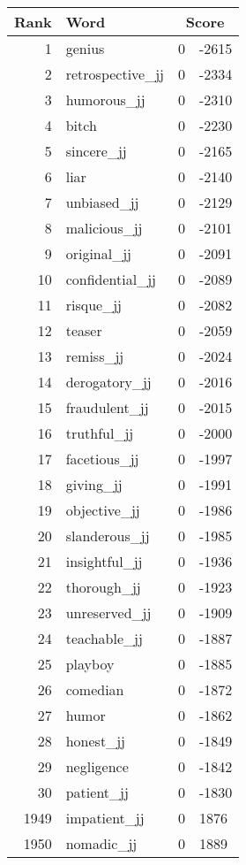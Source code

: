 \begin{longtable}[!htbp]{| rlr@{.}l |}
    \hline
    \textbf{Rank} & \textbf{Word} & \multicolumn{2}{c|}{\textbf{Score}} \\
    \hline
    \endhead
    1 & genius & 0 & -2615 \\
    2 & retrospective\_jj & 0 & -2334 \\
    3 & humorous\_jj & 0 & -2310 \\
    4 & bitch & 0 & -2230 \\
    5 & sincere\_jj & 0 & -2165 \\
    6 & liar & 0 & -2140 \\
    7 & unbiased\_jj & 0 & -2129 \\
    8 & malicious\_jj & 0 & -2101 \\
    9 & original\_jj & 0 & -2091 \\
    10 & confidential\_jj & 0 & -2089 \\
    11 & risque\_jj & 0 & -2082 \\
    12 & teaser & 0 & -2059 \\
    13 & remiss\_jj & 0 & -2024 \\
    14 & derogatory\_jj & 0 & -2016 \\
    15 & fraudulent\_jj & 0 & -2015 \\
    16 & truthful\_jj & 0 & -2000 \\
    17 & facetious\_jj & 0 & -1997 \\
    18 & giving\_jj & 0 & -1991 \\
    19 & objective\_jj & 0 & -1986 \\
    20 & slanderous\_jj & 0 & -1985 \\
    21 & insightful\_jj & 0 & -1936 \\
    22 & thorough\_jj & 0 & -1923 \\
    23 & unreserved\_jj & 0 & -1909 \\
    24 & teachable\_jj & 0 & -1887 \\
    25 & playboy & 0 & -1885 \\
    26 & comedian & 0 & -1872 \\
    27 & humor & 0 & -1862 \\
    28 & honest\_jj & 0 & -1849 \\
    29 & negligence & 0 & -1842 \\
    30 & patient\_jj & 0 & -1830 \\
    1949 & impatient\_jj & 0 & 1876 \\
    1950 & nomadic\_jj & 0 & 1889 \\

\end{longtable}
